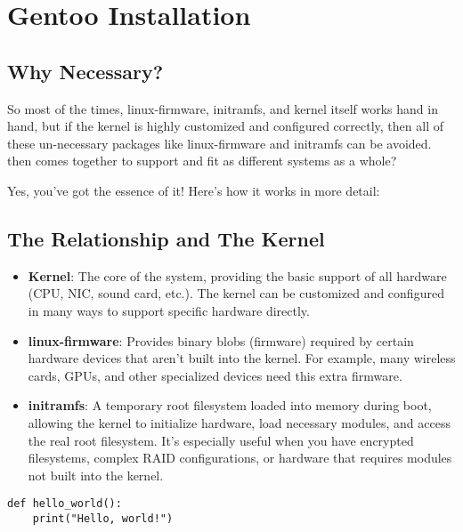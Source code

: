 \chapter{Gentoo Installation}

\section{Why Necessary?}
So most of the times, linux-firmware, initramfs, and kernel itself works hand in hand, but if the kernel is highly customized and configured correctly, then all of these un-necessary packages like linux-firmware and initramfs can be avoided. then comes together to support and fit as different systems as a whole?

Yes, you’ve got the essence of it! Here's how it works in more detail:

\section{The Relationship and The Kernel}

\begin{itemize}
    \item \textbf{Kernel}: The core of the system, providing the basic support of all hardware (CPU, NIC, sound card, etc.). The kernel can be customized and configured in many ways to support specific hardware directly.
    \item \textbf{linux-firmware}: Provides binary blobs (firmware) required by certain hardware devices that aren't built into the kernel. For example, many wireless cards, GPUs, and other specialized devices need this extra firmware.
    \item \textbf{initramfs}: A temporary root filesystem loaded into memory during boot, allowing the kernel to initialize hardware, load necessary modules, and access the real root filesystem. It’s especially useful when you have encrypted filesystems, complex RAID configurations, or hardware that requires modules not built into the kernel.
\end{itemize}

\begin{lstlisting}[caption={Sample Code}, label={lst:sample}]
def hello_world():
    print("Hello, world!")
\end{lstlisting}

